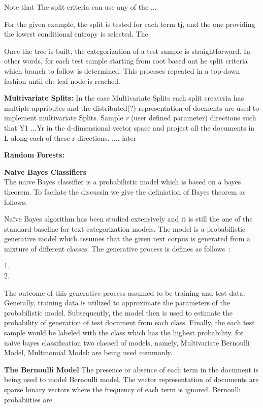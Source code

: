Note that The split criteria can use any of the ...

For the given example, the split is tested for each term tj, and the one providing the lowest conditional entropy is selected. The

Once the tree is built, the categorization of a test sample is straightforward. In other words, for each test sample starting from root based ont he split criteria which branch to follow is determined. This proceses repeated in a top-down fashion until eht leaf node is reached.

\textbf{Multivariate Splits:}
In the case Multivariate Splits each split createria has multiple appributes and the distributed(?) representation of docments are used to implement multivariate Splits. Sample \textit{r} (user defined parameter) directions such that Y1 ...Yr
in the d-dimensional vector space and
project all the documents in L along each of these r directions. .... later 

\textbf{Random Forests:}


\textbf{Naive Bayes Classifiers}\\
The naive Bayes classifier is a probabilistic model which is based on a bayes theorem. To facilate the discussin we give the definiation of Bayes theorem as follows:


Naïve Bayes algorithm has been studied extensively  and it is still the one of the standard baseline for text categorization models. The model is a probabilistic generative model which assumes that the given text corpus is generated from a mixture of different classes. The generative process is defines as follows~\cite{aggarwal2018machine}:

1.\\
2.

The outcome of this generative process assumed to be training and test data. Generally, training data is utilized to approximate the parameters of the probabilistic model. Subsequently, the model then is used to estimate the probability of generation of test document from each class. Finally, the each test sample would be labeled with the class which has the highest probability. for naive bayes classification two classed of models, namely, Multivariate Bernoulli Model, Multinomial Model: are being used commonly.

\textbf{The Bernoulli Model}
The presence or absence of each term in the document is being used to model Bernoulli model. The vector representation of documents are sparse binary vectors where the frequency of each term is ignored. Bernoulli probabiities are


